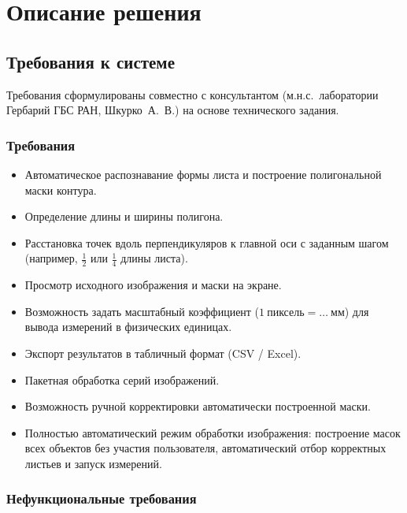 
\section{Описание решения}
\label{sec:solution}

\subsection{Требования к системе}

Требования сформулированы совместно с консультантом (м.н.с.\ лаборатории Гербарий ГБС РАН, Шкурко~А.~В.)
на основе технического задания.

\subsubsection*{Требования}

\begin{itemize}
    \item Автоматическое распознавание формы листа и построение полигональной маски контура.
    \item Определение длины и ширины полигона.
    \item Расстановка точек вдоль перпендикуляров к главной оси с заданным шагом (например, $\frac{1}{2}$ или $\frac{1}{4}$ длины листа).
    \item Просмотр исходного изображения и маски на экране.
    \item Возможность задать масштабный коэффициент ($1~\text{пиксель} = \ldots~\text{мм}$) для вывода измерений в физических единицах.
    \item Экспорт результатов в табличный формат (CSV / Excel).
    \item Пакетная обработка серий изображений.
    \item Возможность ручной корректировки автоматически построенной маски.
    \item Полностью автоматический режим обработки изображения: построение масок всех объектов без участия пользователя, автоматический отбор корректных листьев и запуск измерений.
\end{itemize}

\subsubsection*{Нефункциональные требования}

